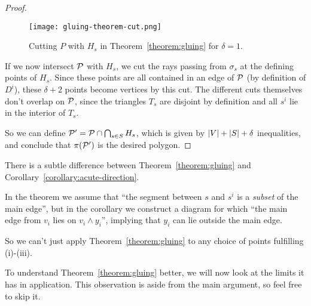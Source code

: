 \begin{proof}
  \begin{figure}[ht]
    \centering
    \texttt{[image: gluing-theorem-cut.png]}
    \caption{Cutting $P$ with $H_s$ in Theorem~\ref{theorem:gluing} for $\delta = 1$.}
    \label{fig:gluing-theorem-cut}
  \end{figure}

  If we now intersect $\P$ with $H_s$, we cut the rays passing from $\sigma_s$ at the defining points of $H_s$. Since these points are all contained in an edge of $\P$ (by definition of $D^i$), these $\delta + 2$ points become vertices by this cut. The different cuts themselves don't overlap on $\P$, since the triangles $T_s$ are disjoint by definition and all $s^i$ lie in the interior of $T_s$.

  So we can define $\P' = \P \cap \bigcap_{s \in S} H_s$, which is given by $\abs{V}+\abs{S}+\delta$ inequalities, and conclude that $\pi(\P')$ is the desired polygon.
\end{proof}

\begin{remark}\label{remark:pitfall}
  There is a subtle difference between Theorem~\ref{theorem:gluing} and Corollary~\ref{corollary:acute-direction}.

  In the theorem we assume that ``the segment between $s$ and $s^i$ is a \emph{subset} of the main edge'', but in the corollary we construct a diagram for which ``the main edge from $v_i$ lies on $v_i \wedge y_i$'', implying that $y_i$ can lie outside the main edge.

  So we can't just apply Theorem~\ref{theorem:gluing} to any choice of points fulfilling (i)-(iii).
\end{remark}

To understand Theorem~\ref{theorem:gluing} better, we will now look at the limits it has in application. This observation is aside from the main argument, so feel free to skip it.

